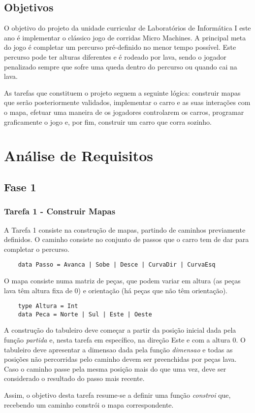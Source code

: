\documentclass[a4paper]{report}
\begin{document}
\section{Objetivos}

O objetivo do projeto da unidade curricular de Laboratórios de Informática I este ano é implementar o clássico jogo de corridas Micro Machines. A principal meta do jogo é completar um percurso pré-definido no menor tempo possível. Este percurso pode ter alturas diferentes e é rodeado por lava, sendo o jogador penalizado sempre que sofre uma queda dentro do percurso ou quando cai na lava.

As tarefas que constituem o projeto seguem a seguinte lógica: construir mapas que serão posteriormente validados, implementar o carro e as suas interações com o mapa, efetuar uma maneira de os jogadores controlarem os carros, programar graficamente o jogo e, por fim, construir um carro que corra sozinho.

\chapter{Análise de Requisitos}

\section{Fase 1}

\subsection{Tarefa 1 - Construir Mapas}

A Tarefa 1 consiste na construção de mapas, partindo de caminhos previamente definidos. O caminho consiste no conjunto de passos que o carro tem de dar para completar o percurso.

\begin{verbatim}
    data Passo = Avanca | Sobe | Desce | CurvaDir | CurvaEsq
\end{verbatim}

O mapa consiste numa matriz de peças, que podem variar em altura (as peças lava têm altura fixa de 0) e orientação (há peças que não têm orientação). 

\begin{verbatim}
    type Altura = Int
    data Peca = Norte | Sul | Este | Oeste
\end{verbatim}

A construção do tabuleiro deve começar a partir da posição inicial dada pela função \textit{partida} e, nesta tarefa em específico, na direção Este e com a altura 0. O tabuleiro deve apresentar a dimensao dada pela função \textit{dimensao} e todas as posições não percorridas pelo caminho devem ser preenchidas por peças lava. Caso o caminho passe pela mesma posição mais do que uma vez, deve ser considerado o resultado do passo mais recente. \par
Assim, o objetivo desta tarefa resume-se a definir uma função \textit{constroi} que, recebendo um caminho constrói o mapa correspondente.
\end{document}
